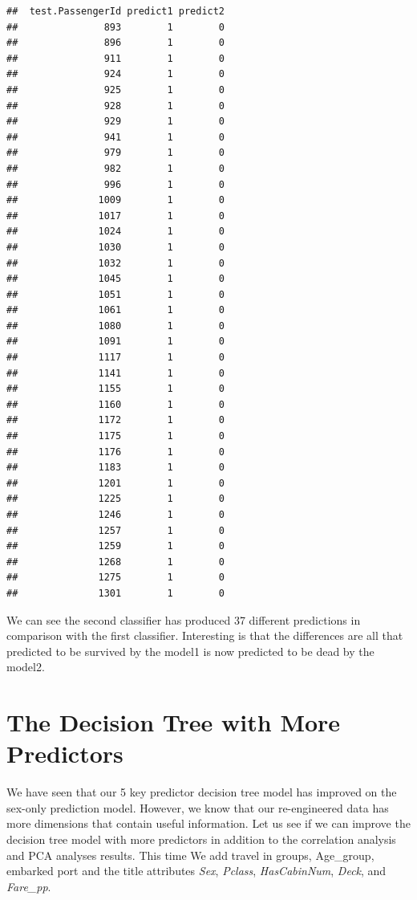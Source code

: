 \documentclass[
]{book}
\begin{document}
\begin{verbatim}
##  test.PassengerId predict1 predict2
##               893        1        0
##               896        1        0
##               911        1        0
##               924        1        0
##               925        1        0
##               928        1        0
##               929        1        0
##               941        1        0
##               979        1        0
##               982        1        0
##               996        1        0
##              1009        1        0
##              1017        1        0
##              1024        1        0
##              1030        1        0
##              1032        1        0
##              1045        1        0
##              1051        1        0
##              1061        1        0
##              1080        1        0
##              1091        1        0
##              1117        1        0
##              1141        1        0
##              1155        1        0
##              1160        1        0
##              1172        1        0
##              1175        1        0
##              1176        1        0
##              1183        1        0
##              1201        1        0
##              1225        1        0
##              1246        1        0
##              1257        1        0
##              1259        1        0
##              1268        1        0
##              1275        1        0
##              1301        1        0
\end{verbatim}

We can see the second classifier has produced 37 different predictions in comparison with the first classifier. Interesting is that the differences are all that predicted to be survived by the model1 is now predicted to be dead by the model2.

\hypertarget{the-decision-tree-with-more-predictors}{%
\section{The Decision Tree with More Predictors}\label{the-decision-tree-with-more-predictors}}

We have seen that our 5 key predictor decision tree model has improved on the sex-only prediction model. However, we know that our re-engineered data has more dimensions that contain useful information. Let us see if we can improve the decision tree model with more predictors in addition to the correlation analysis and PCA analyses results. This time We add travel in groups, Age\_group, embarked port and the title attributes \emph{Sex}, \emph{Pclass}, \emph{HasCabinNum}, \emph{Deck}, and \emph{Fare\_pp}.
\end{document}
